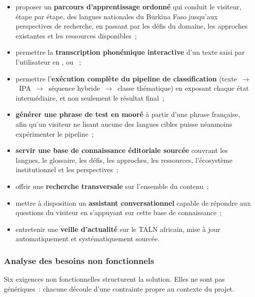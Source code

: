 \begin{itemize}
	\item proposer un \textbf{parcours d'apprentissage ordonné} qui conduit le
	visiteur, étape par étape, des langues nationales du Burkina Faso jusqu'aux
	perspectives de recherche, en passant par les défis du domaine, les approches
	existantes et les ressources disponibles~;
	\item permettre la \textbf{transcription phonémique interactive} d'un texte saisi
	par l'utilisateur en ,  ou ~;
	\item permettre l'\textbf{exécution complète du pipeline de classification}
	(texte~$\rightarrow$~IPA~$\rightarrow$~séquence hybride~$\rightarrow$~classe
	thématique) en exposant chaque état intermédiaire, et non seulement le résultat
	final~;
	\item \textbf{générer une phrase de test en mooré} à partir d'une phrase française,
	afin qu'un visiteur ne lisant aucune des langues cibles puisse néanmoins
	expérimenter le pipeline~;
	\item \textbf{servir une base de connaissance éditoriale sourcée} couvrant les
	langues, le glossaire, les défis, les approches, les ressources, l'écosystème
	institutionnel et les perspectives~;
	\item offrir une \textbf{recherche transversale} sur l'ensemble du contenu~;
	\item mettre à disposition un \textbf{assistant conversationnel} capable de
	répondre aux questions du visiteur en s'appuyant sur cette base de connaissance~;
	\item entretenir une \textbf{veille d'actualité} sur le TALN africain, mise à jour
	automatiquement et systématiquement sourcée.
\end{itemize}

\subsubsection{Analyse des besoins non fonctionnels}

Six exigences non fonctionnelles structurent la solution. Elles ne sont pas
génériques~: chacune découle d'une contrainte propre au contexte du projet.

